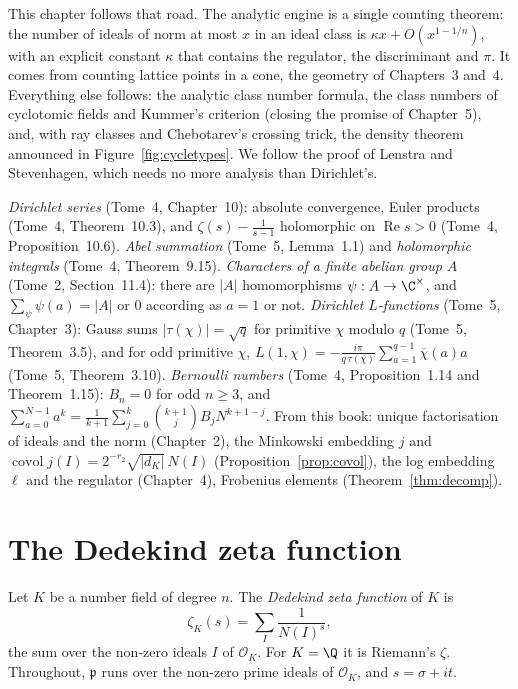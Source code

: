 This chapter follows that road. The analytic engine is a single counting theorem: the number of ideals of norm at most $x$
in an ideal class is $\kappa x+O(x^{1-1/n})$, with an explicit constant $\kappa$ that contains the regulator, the
discriminant and $\pi$. It comes from counting lattice points in a cone, the geometry of Chapters~3 and~4. Everything else
follows: the analytic class number formula, the class numbers of cyclotomic fields and Kummer's criterion (closing the
promise of Chapter~5), and, with ray classes and Chebotarev's crossing trick, the density theorem announced in
Figure~\ref{fig:cycletypes}. We follow the proof of Lenstra and Stevenhagen, which needs no more analysis than Dirichlet's.

\begin{reminder}
\emph{Dirichlet series} (Tome~4, Chapter~10): absolute convergence, Euler products (Tome~4, Theorem~10.3),
and $\zeta(s)-\frac1{s-1}$ holomorphic on $\operatorname{Re}s>0$ (Tome~4, Proposition~10.6).
\emph{Abel summation} (Tome~5, Lemma~1.1) and \emph{holomorphic integrals} (Tome~4, Theorem~9.15).
\emph{Characters of a finite abelian group $A$} (Tome~2, Section~11.4): there are $|A|$ homomorphisms
$\psi:A\to\C^\times$, and $\sum_\psi\psi(a)=|A|$ or $0$ according as $a=1$ or not. \emph{Dirichlet $L$-functions} (Tome~5,
Chapter~3): Gauss sums $|\tau(\chi)|=\sqrt q$ for primitive $\chi$ modulo $q$ (Tome~5, Theorem~3.5), and for odd
primitive $\chi$, $L(1,\chi)=-\frac{i\pi}{q\,\tau(\overline\chi)}\sum_{a=1}^{q-1}\overline\chi(a)a$ (Tome~5,
Theorem~3.10). \emph{Bernoulli numbers} (Tome~4, Proposition~1.14 and Theorem~1.15):
$B_n=0$ for odd $n\ge3$, and $\sum_{a=0}^{N-1}a^k=\frac1{k+1}\sum_{j=0}^k\binom{k+1}jB_jN^{k+1-j}$. From this book: unique
factorisation of ideals and the norm (Chapter~2), the Minkowski embedding $j$ and $\operatorname{covol}j(I)=2^{-r_2}
\sqrt{|d_K|}\,N(I)$ (Proposition~\ref{prop:covol}), the log embedding $\ell$ and the regulator (Chapter~4), Frobenius
elements (Theorem~\ref{thm:decomp}).
\end{reminder}

\section{The Dedekind zeta function}

Let $K$ be a number field of degree $n$. The \emph{Dedekind zeta function} of $K$ is
\[
\zeta_K(s)=\sum_{I}\frac1{N(I)^s},
\]
the sum over the non-zero ideals $I$ of $\mathcal O_K$. For $K=\Q$ it is Riemann's $\zeta$. Throughout, $\mathfrak p$ runs over the
non-zero prime ideals of $\mathcal O_K$, and $s=\sigma+it$.

